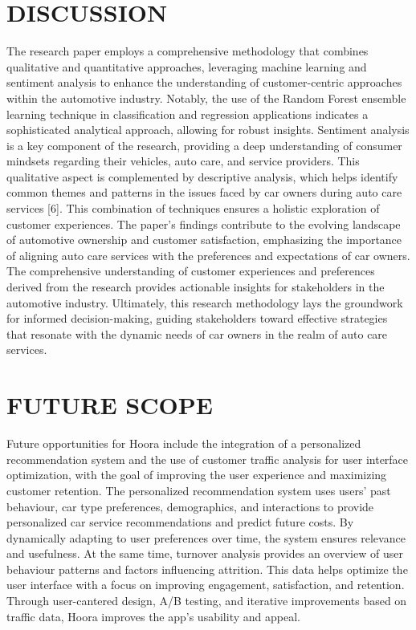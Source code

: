 \documentclass[conference]{IEEEtran}
\begin{document}
\section{DISCUSSION}
The research paper employs a comprehensive methodology that combines qualitative and quantitative approaches, leveraging machine learning and sentiment analysis to enhance the understanding of customer-centric approaches within the automotive industry. Notably, the use of the Random Forest ensemble learning technique in classification and regression applications indicates a sophisticated analytical approach, allowing for robust insights. 
Sentiment analysis is a key component of the research, providing a deep understanding of consumer mindsets regarding their vehicles, auto care, and service providers. This qualitative aspect is complemented by descriptive analysis, which helps identify common themes and patterns in the issues faced by car owners during auto care services [6]. This combination of techniques ensures a holistic exploration of customer experiences. 
The paper's findings contribute to the evolving landscape of automotive ownership and customer satisfaction, emphasizing the importance of aligning auto care services with the preferences and expectations of car owners. The comprehensive understanding of customer experiences and preferences derived from the research provides actionable insights for stakeholders in the automotive industry. Ultimately, this research methodology lays the groundwork for informed decision-making, guiding stakeholders toward effective strategies that resonate with the dynamic needs of car owners in the realm of auto care services. 

\section{FUTURE SCOPE}
Future opportunities for Hoora include the integration of a personalized recommendation system and the use of customer traffic analysis for user interface optimization, with the goal of improving the user experience and maximizing customer retention. The personalized recommendation system uses users' past behaviour, car type preferences, demographics, and interactions to provide personalized car service recommendations and predict future costs. By dynamically adapting to user preferences over time, the system ensures relevance and usefulness. At the same time, turnover analysis provides an overview of user behaviour patterns and factors influencing attrition. This data helps optimize the user interface with a focus on improving engagement, satisfaction, and retention. Through user-cantered design, A/B testing, and iterative improvements based on traffic data, Hoora improves the app's usability and appeal.
\end{document}

